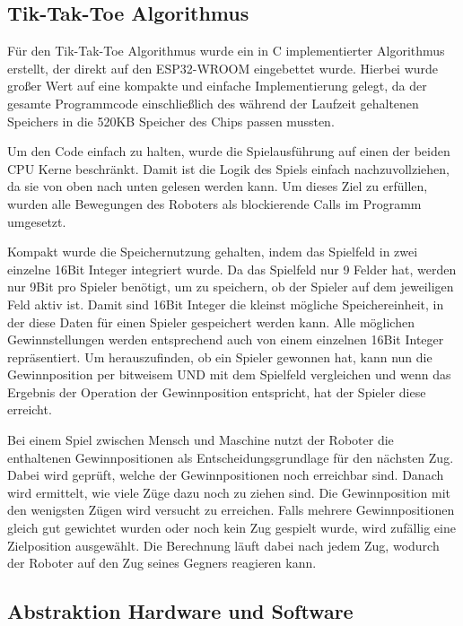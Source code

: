 \documentclass[conference,compsoc,final,a4paper]{IEEEtran}
\begin{document}
\subsection{Tik-Tak-Toe Algorithmus}

Für den Tik-Tak-Toe Algorithmus wurde ein in C implementierter Algorithmus erstellt, der direkt auf
den ESP32-WROOM eingebettet wurde. Hierbei wurde großer Wert auf eine kompakte und einfache
Implementierung gelegt, da der gesamte Programmcode einschließlich des während der Laufzeit
gehaltenen Speichers in die 520KB Speicher des Chips passen mussten.

Um den Code einfach zu halten, wurde die Spielausführung auf einen der beiden CPU Kerne beschränkt.
Damit ist die Logik des Spiels einfach nachzuvollziehen, da sie von oben nach unten gelesen werden kann.
Um dieses Ziel zu erfüllen, wurden alle Bewegungen des Roboters als blockierende Calls im Programm
umgesetzt.

Kompakt wurde die Speichernutzung gehalten, indem das Spielfeld in zwei einzelne 16Bit Integer integriert wurde.
Da das Spielfeld nur 9 Felder hat, werden nur 9Bit pro Spieler benötigt, um zu speichern, ob der Spieler
auf dem jeweiligen Feld aktiv ist. Damit sind 16Bit Integer die kleinst mögliche Speichereinheit, in der
diese Daten für einen Spieler gespeichert werden kann. Alle möglichen Gewinnstellungen werden entsprechend
auch von einem einzelnen 16Bit Integer repräsentiert. Um herauszufinden, ob ein Spieler gewonnen hat, kann
nun die Gewinnposition per bitweisem UND mit dem Spielfeld vergleichen und wenn das Ergebnis der Operation
der Gewinnposition entspricht, hat der Spieler diese erreicht.

Bei einem Spiel zwischen Mensch und Maschine nutzt der Roboter die enthaltenen Gewinnpositionen als
Entscheidungsgrundlage für den nächsten Zug. Dabei wird geprüft, welche der Gewinnpositionen noch erreichbar
sind. Danach wird ermittelt, wie viele Züge dazu noch zu ziehen sind. Die Gewinnposition mit den
wenigsten Zügen wird versucht zu erreichen. Falls mehrere Gewinnpositionen gleich gut gewichtet wurden
oder noch kein Zug gespielt wurde, wird zufällig eine Zielposition ausgewählt. Die Berechnung läuft
dabei nach jedem Zug, wodurch der Roboter auf den Zug seines Gegners reagieren kann.

\subsection{Abstraktion Hardware und Software}
\end{document}
